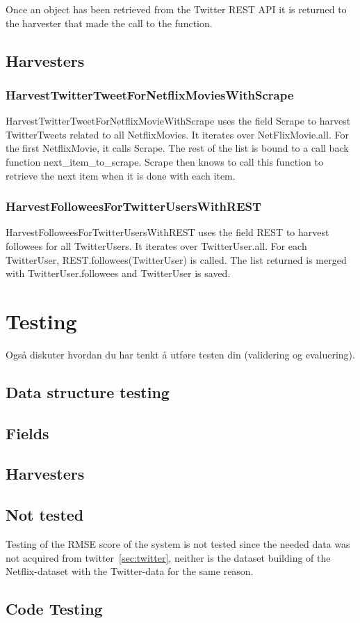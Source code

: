 Once an object has been retrieved from the Twitter REST API it is returned to the harvester that made the call to the function.

\subsection{Harvesters}
\subsubsection{HarvestTwitterTweetForNetflixMoviesWithScrape}
HarvestTwitterTweetForNetflixMovieWithScrape uses the field Scrape to harvest TwitterTweets related to all NetflixMovies. It iterates over NetFlixMovie.all. For the first NetflixMovie, it calls Scrape. The rest of the list is bound to a call back function next\_item\_to\_scrape. Scrape then knows to call this function to retrieve the next item when it is done with each item.

\subsubsection{HarvestFolloweesForTwitterUsersWithREST}
HarvestFolloweesForTwitterUsersWithREST uses the field REST to harvest followees for all TwitterUsers. It iterates over TwitterUser.all. For each TwitterUser, REST.followees(TwitterUser) is called. The list returned is merged with TwitterUser.followees and TwitterUser is saved.


\section{Testing}\label{impl:Testing}
Også diskuter hvordan du har tenkt å utføre testen din (validering og evaluering).
\subsection{Data structure testing}


\subsection{Fields}


\subsection{Harvesters}


\subsection{Not tested}
Testing of the RMSE score of the system is not tested since the needed data was not acquired from twitter~\ref{sec:twitter}, neither is the dataset building of the Netflix-dataset with the Twitter-data for the same reason.

\subsection{Code Testing}

